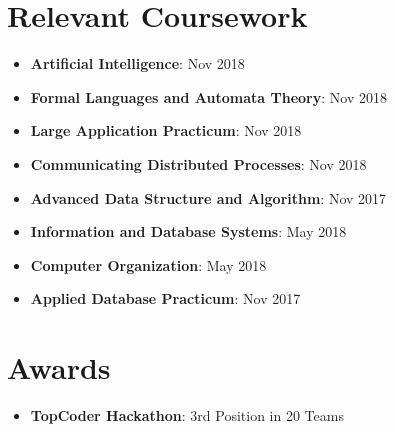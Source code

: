 \documentclass[letterpaper,11pt]{article}
\newcommand{\resumeItem}[2]{
  \item\small{
    \textbf{#1}{: #2 \vspace{-2pt}}
  }
}
\newcommand{\resumeSubItem}[2]{\resumeItem{#1}{#2}\vspace{-4pt}}
\newcommand{\resumeSubHeadingListStart}{\begin{itemize}[leftmargin=*]}
\newcommand{\resumeSubHeadingListEnd}{\end{itemize}}
\begin{document}
  
\section{Relevant Coursework}
  \resumeSubHeadingListStart
  \resumeSubItem
      {Artificial Intelligence}{Nov 2018}
    \resumeSubItem
    {Formal Languages and Automata Theory}{Nov 2018}
    \resumeSubItem
    {Large Application Practicum}{Nov 2018}
    \resumeSubItem
    {Communicating Distributed Processes}{Nov 2018}
    \resumeSubItem
    {Advanced Data Structure and Algorithm}{Nov 2017}
    \resumeSubItem
    {Information and Database Systems}{May 2018}
    \resumeSubItem
    {Computer Organization}{May 2018}
    \resumeSubItem
    {Applied Database Practicum}{Nov 2017}
          

  \resumeSubHeadingListEnd

\section{Awards}
  \resumeSubHeadingListStart

    \resumeSubItem
    {TopCoder Hackathon}{3rd Position in 20 Teams}

 \resumeSubHeadingListEnd

\end{document}
